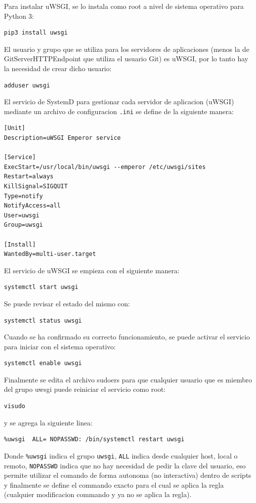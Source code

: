Para instalar uWSGI, se lo instala como root a nivel de sistema operativo para Python 3:
\begin{lstlisting}
pip3 install uwsgi
\end{lstlisting}

El usuario y grupo que se utiliza para los servidores de aplicaciones (menos la de GitServerHTTPEndpoint que utiliza el usuario Git) es uWSGI, por lo tanto hay la necesidad de crear dicho usuario:
\begin{lstlisting}
adduser uwsgi
\end{lstlisting}

El servicio de SystemD para gestionar cada servidor de aplicacion (uWSGI) mediante un archivo de configuracion \texttt{.ini} se define de la siguiente manera: 
\begin{lstlisting}
[Unit]
Description=uWSGI Emperor service

[Service]
ExecStart=/usr/local/bin/uwsgi --emperor /etc/uwsgi/sites
Restart=always
KillSignal=SIGQUIT
Type=notify
NotifyAccess=all
User=uwsgi
Group=uwsgi

[Install]
WantedBy=multi-user.target
\end{lstlisting}

El servicio de uWSGI se empieza con el siguiente manera:
\begin{lstlisting}
systemctl start uwsgi
\end{lstlisting}

Se puede revisar el estado del mismo con:
\begin{lstlisting}
systemctl status uwsgi
\end{lstlisting}

Cuando se ha confirmado su correcto funcionamiento, se puede activar el servicio para iniciar con el sistema operativo:
\begin{lstlisting}
systemctl enable uwsgi
\end{lstlisting}

Finalmente se edita el archivo sudoers para que cualquier usuario que es miembro del grupo uwsgi puede reiniciar el servicio como root:
\begin{lstlisting}
visudo
\end{lstlisting}
y se agrega la siguiente linea:
\begin{lstlisting}
%uwsgi  ALL= NOPASSWD: /bin/systemctl restart uwsgi
\end{lstlisting}
Donde \texttt{\%uwsgi} indica el grupo \texttt{uwsgi}, \texttt{ALL} indica desde cualquier host, local o remoto, \texttt{NOPASSWD} indica que no hay necesidad de pedir la clave del usuario, eso permite utilizar el comando de forma autonoma (no interactiva) dentro de scripts y finalmente se define el commando exacto para el cual se aplica la regla (cualquier modificacion commando y ya no se aplica la regla).

